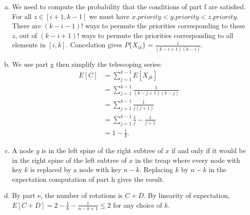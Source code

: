 \documentclass{article}
\begin{document}
\begin{enumerate}[a.]
\item We need to compute the probability that the conditions of part f are satisfied. For all $z \in [i+1, k-1]$ we must have $x.priority < y.priority < z.priority$.  There are $(k-i-1)!$ ways to permute the priorities corresponding to these $z$, out of $(k-i+1)!$ ways to permute the priorities corresponding to all elements in $[i,k]$.  Cancelation gives $P\{X_{ik}\} = \frac{1}{(k-i+1)(k-i)}$. \\

\item We use part g then simplify the telescoping series:
\begin{align*}
E[C] &= \sum_{j=1}^{k-1} E[X_{jk}] \\
&= \sum_{j=1}^{k-1} \frac{1}{(k-j+1)(k-j)}\\
&= \sum_{j=1}^{k-1}\frac{1}{j(j+1)} \\
&= \sum_{j=1}^{k-1}\frac{1}{j} - \frac{1}{j+1} \\
&= 1 - \frac{1}{k}.
\end{align*}

\item A node $y$ is in the left spine of the right subtree of $x$ if and only if it would be in the right spine of the left subtree of $x$ in the treap where every node with key $k$ is replaced by a node with key $n-k$.  Replacing $k$ by $n-k$ in the expectation computation of part h gives the result. \\

\item  By part e, the number of rotations is $C + D$.  By linearity of expectation, $E[C+D] = 2 - \frac{1}{k} - \frac{1}{n-k+1} \leq 2$ for any choice of $k$.

\end{enumerate}
\end{document}
